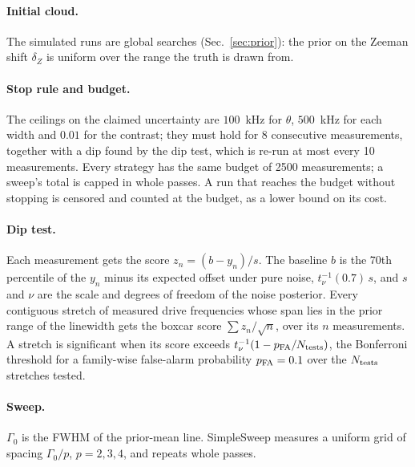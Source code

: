 \paragraph{Initial cloud.} The simulated runs are global searches (Sec.~\ref{sec:prior}): the prior on the Zeeman
shift $\delta_Z$ is uniform over the range the truth is drawn from. 

\paragraph{Stop rule and budget.} The ceilings on the claimed uncertainty are $100$~kHz for $\theta$, $500$~kHz for
each width and $0.01$ for the contrast; they must hold for 8 consecutive measurements, together with a dip found by
the dip test, which is re-run at most every 10 measurements. Every strategy has the same budget of 2500
measurements; a sweep's total is capped in whole passes. A run that reaches the budget without stopping is censored
and counted at the budget, as a lower bound on its cost.

\paragraph{Dip test.} Each measurement gets the score $z_n=(b-y_n)/s$. The baseline $b$ is the 70th percentile of
the $y_n$ minus its expected offset under pure noise, $t_\nu^{-1}(0.7)\,s$, and $s$ and $\nu$ are the scale and
degrees of freedom of the noise posterior. Every contiguous stretch of measured drive frequencies whose span lies in
the prior range of the linewidth gets the boxcar score $\sum z_n/\sqrt{n}$, over its $n$ measurements. A stretch is
significant when its score exceeds $t_\nu^{-1}(1-p_{\rm FA}/N_{\rm tests})$, the Bonferroni threshold for a
family-wise false-alarm probability $p_{\rm FA}=0.1$ over the $N_{\rm tests}$ stretches tested.

\paragraph{Sweep.} $\Gamma_0$ is the FWHM of the prior-mean line. SimpleSweep measures a uniform grid of
spacing $\Gamma_0/p$, $p=2,3,4$, and repeats whole passes.

